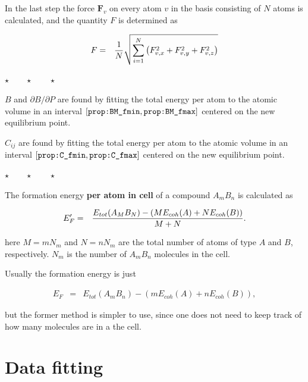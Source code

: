\documentclass[a4paper,12pt,onecolumn]{article}
\def\F{\mathbf{F}}
\newcommand{\stars}{\begin{center} \vspace{0.5cm}$\star \qquad \star \qquad \star$\vspace{0.5cm}\end{center}}
\begin{document}
In the last step the force $\F_v$ on every atom $v$ in the basis consisting of
$N$ atoms is calculated, and the quantity $F$ is determined as

\begin{eqnarray}
F &=& {1 \over N} \sqrt{ \sum_{i=1}^N \left( F^2_{v,x} + F^2_{v,y} + F^2_{v,z} \right) }
\end{eqnarray}





\stars









$B$ and $\partial B / \partial P$ are found by fitting
the total energy per atom to the atomic volume in an interval
$[\verb+prop:BM_fmin+, \verb+prop:BM_fmax+]$
centered on the new equilibrium point.

$C_{ij}$ are found by fitting
the total energy per atom to the atomic volume in an interval
$[\verb+prop:C_fmin+, \verb+prop:C_fmax+]$
centered on the new equilibrium point.



\stars



The formation energy \textbf{per atom in cell} of a compound $A_m B_n$
is calculated as

\begin{eqnarray}
E_F'  &=&  { E_{tot}(A_M B_N) - \left( M E_{coh}(A) + N E_{coh}(B) \right) \over M + N }.
\end{eqnarray}

here $M = m N_m$ and $N = n N_m$ are the total number of atoms of type $A$ and $B$,
respectively. $N_m$ is the number of $A_m B_n$ molecules in the cell.

Usually the formation energy is just

\begin{eqnarray}
E_F  &=&  E_{tot}(A_m B_n) - \left( m E_{coh}(A) + n E_{coh}(B) \right),
\nonumber
\end{eqnarray}

but the former method is simpler to use, since one does not need to keep track of
how many molecules are in a the cell.







\section{Data fitting}
\end{document}
